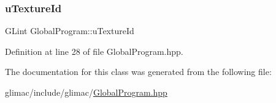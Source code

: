 \subsubsection{\texorpdfstring{u\+Texture\+Id}{uTextureId}}
{\footnotesize\ttfamily G\+Lint Global\+Program\+::u\+Texture\+Id}



Definition at line 28 of file Global\+Program.\+hpp.



The documentation for this class was generated from the following file\+:\begin{DoxyCompactItemize}
\item 
glimac/include/glimac/\hyperlink{_global_program_8hpp}{Global\+Program.\+hpp}\end{DoxyCompactItemize}
